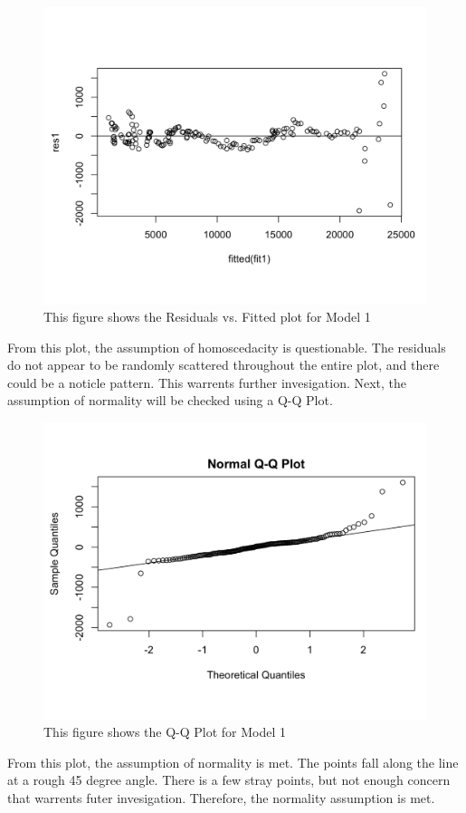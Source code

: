 \documentclass[12pt]{article}
\begin{document}
\begin{figure}[H]
  \centering
  \includegraphics[scale = .35]{res1}
  \caption{This figure shows the Residuals vs. Fitted plot for Model 1}
\end{figure}
From this plot, the assumption of homoscedacity is questionable. 
The residuals do not appear to be randomly scattered throughout the entire plot, and there could be a noticle pattern. 
This warrents further invesigation. Next, the assumption of normality will be checked using a Q-Q Plot. 
\begin{figure}[H]
  \centering
  \includegraphics[scale = .35]{norm1}
  \caption{This figure shows the Q-Q Plot for Model 1}
\end{figure}
From this plot, the assumption of normality is met. 
The points fall along the line at a rough 45 degree angle. 
There is a few stray points, but not enough concern that warrents futer invesigation.
Therefore, the normality assumption is met. 
\end{document}
